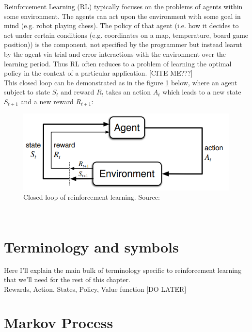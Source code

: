 Reinforcement Learning (RL) typically focuses on the problems of agents within some environment. The agents can act upon the environment with some goal in mind (e.g. robot playing chess). The policy of that agent (i.e. how it decides to act under certain conditions (e.g. coordinates on a map, temperature, board game position)) is the component, not specified by the programmer but instead learnt by the agent via trial-and-error interactions with the environment over the learning period. Thus RL often reduces to a problem of learning the optimal policy in the context of a particular application. [CITE ME???] \\

This closed loop can be demonstrated as in the figure \ref{fig:closed_loop} below, where an agent subject to state $S_{t}$
and reward $R_{t}$ takes an action $A_{t}$ which leads to a new
state $S_{t+1}$ and a new reward $R_{t+1}$:

\begin{figure}[h!]
  \centering
  \includegraphics[scale=0.7]{figures/closed_loop.PNG}
  \caption{Closed-loop of reinforcement learning. Source: \cite{sutton_barto}}
  \label{fig:closed_loop}
\end{figure}\\  

\section{Terminology and symbols}
Here I'll explain the main bulk of terminology specific to reinforcement learning that we'll need for the rest of this chapter.\\

Rewards, Action, States, Policy, Value function [DO LATER]
 
\section{Markov Process}

